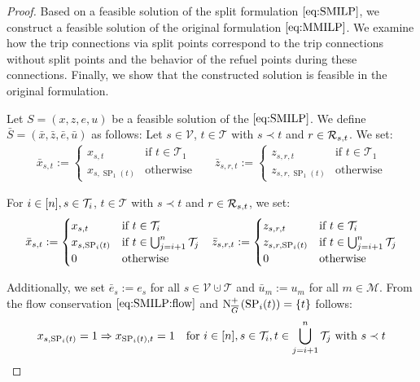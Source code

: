 \begin{proof}

Based on a feasible solution of the split formulation $\eqref{eq:SMILP}$, we construct a feasible solution of the original formulation $\eqref{eq:MMILP}$. We examine how the trip connections via split points correspond to the trip connections without split points and the behavior of the refuel points during these connections. Finally, we show that the constructed solution is feasible in the original formulation.

Let ${S=(x,z,e,u)}$ be a feasible solution of the $\eqref{eq:SMILP}$. We define ${\bar{S}=\left(\bar{x},\bar{z},\bar{e},\bar{u}\right)}$ as follows: Let ${s\in\mathcal{V}}$, ${t\in\mathcal{T}}$ with ${s\prec t}$ and ${r\in\mathcal{R}_{s,t}}$. We set:
\begin{align*}
	\bar{x}_{s,t} := \begin{cases} x_{s,t} & \text{if } t\in\mathcal{T}_1 \\ x_{s,\operatorname{SP}_1(t)} & \text{otherwise} \end{cases} &&
	\bar{z}_{s,r,t} := \begin{cases} z_{s,r,t} & \text{if } t\in\mathcal{T}_1 \\ z_{s,r,\operatorname{SP}_1(t)} & \text{otherwise} \end{cases}
\end{align*}

For ${i\in[n]}, {s\in\mathcal{T}_i}$, ${t\in\mathcal{T}}$ with ${s\prec t}$ and ${r\in\mathcal{R}_{s,t}}$, we set:
\begin{align*}
	\bar{x}_{s,t} := \begin{cases} x_{s,t} & \text{if } t\in\mathcal{T}_i \\ x_{s,\operatorname{SP}_i(t)} & \text{if } t\in\bigcup_{j=i+1}^n \mathcal{T}_j \\ 0 & \text{otherwise} \end{cases} &&
	\bar{z}_{s,r,t} := \begin{cases} z_{s,r,t} & \text{if } t\in\mathcal{T}_i \\ z_{s,r,\operatorname{SP}_i(t)} & \text{if } t\in\bigcup_{j=i+1}^n \mathcal{T}_j \\ 0 & \text{otherwise} \end{cases}
\end{align*}

Additionally, we set ${\bar{e}_s := e_s}$ for all ${s\in\mathcal{V}\cupdot\mathcal{T}}$ and ${\bar{u}_m := u_m}$ for all ${m\in\mathcal{M}}$. From the flow conservation $\eqref{eq:SMILP:flow}$ and ${\operatorname{N}_{\overline{G}}^+\left(\operatorname{SP}_i(t)\right)=\{t\}}$ follows:
\begin{align*}
	x_{s,\operatorname{SP}_i(t)}=1 \Rightarrow x_{\operatorname{SP}_i(t),t}=1 && \text{for } i\in[n], s\in\mathcal{T}_i, t\in\bigcup_{j=i+1}^n \mathcal{T}_j \text{ with } s\prec t
\end{align*}


\end{proof}
